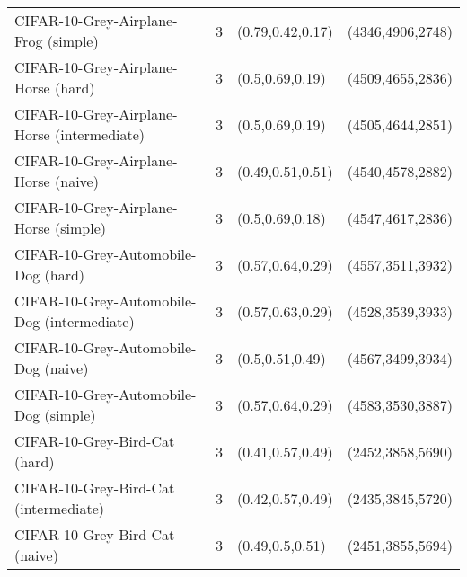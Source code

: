 \begin{tabular}{llll}
            CIFAR-10-Grey-Airplane-Frog (simple) &              3 &                                    (0.79,0.42,0.17) &                                               (4346,4906,2748) \\
             CIFAR-10-Grey-Airplane-Horse (hard) &              3 &                                     (0.5,0.69,0.19) &                                               (4509,4655,2836) \\
     CIFAR-10-Grey-Airplane-Horse (intermediate) &              3 &                                     (0.5,0.69,0.19) &                                               (4505,4644,2851) \\
            CIFAR-10-Grey-Airplane-Horse (naive) &              3 &                                    (0.49,0.51,0.51) &                                               (4540,4578,2882) \\
           CIFAR-10-Grey-Airplane-Horse (simple) &              3 &                                     (0.5,0.69,0.18) &                                               (4547,4617,2836) \\
             CIFAR-10-Grey-Automobile-Dog (hard) &              3 &                                    (0.57,0.64,0.29) &                                               (4557,3511,3932) \\
     CIFAR-10-Grey-Automobile-Dog (intermediate) &              3 &                                    (0.57,0.63,0.29) &                                               (4528,3539,3933) \\
            CIFAR-10-Grey-Automobile-Dog (naive) &              3 &                                     (0.5,0.51,0.49) &                                               (4567,3499,3934) \\
           CIFAR-10-Grey-Automobile-Dog (simple) &              3 &                                    (0.57,0.64,0.29) &                                               (4583,3530,3887) \\
                   CIFAR-10-Grey-Bird-Cat (hard) &              3 &                                    (0.41,0.57,0.49) &                                               (2452,3858,5690) \\
           CIFAR-10-Grey-Bird-Cat (intermediate) &              3 &                                    (0.42,0.57,0.49) &                                               (2435,3845,5720) \\
                  CIFAR-10-Grey-Bird-Cat (naive) &              3 &                                     (0.49,0.5,0.51) &                                               (2451,3855,5694) \\

\end{tabular}

